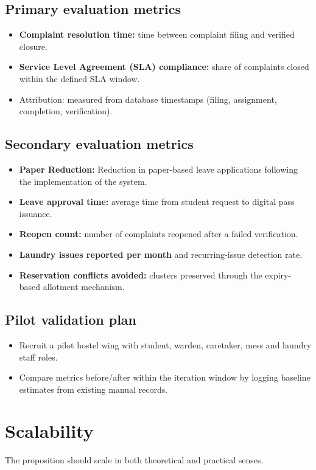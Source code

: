 \documentclass[11pt,a4paper]{article}
\begin{document}
\subsection{Primary evaluation metrics}
\begin{itemize}[leftmargin=0.7cm]
    \item \textbf{Complaint resolution time:} time between complaint filing and verified
    closure.
    \item \textbf{Service Level Agreement (SLA) compliance:} share of complaints closed within the defined SLA window.
    \item Attribution: measured from database timestamps (filing, assignment, completion,
    verification).
\end{itemize}

\subsection{Secondary evaluation metrics}
\begin{itemize}[leftmargin=0.7cm]
    \item \textbf{Paper Reduction:} Reduction in paper-based leave applications following the implementation of the system.
    \item \textbf{Leave approval time:} average time from student request to digital pass
    issuance.
    \item \textbf{Reopen count:} number of complaints reopened after a failed verification.
    \item \textbf{Laundry issues reported per month} and recurring-issue detection rate.
    \item \textbf{Reservation conflicts avoided:} clusters preserved through the expiry-based
    allotment mechanism.
\end{itemize}

\subsection{Pilot validation plan }
\begin{itemize}[leftmargin=0.7cm]
    \item Recruit a pilot hostel wing with student, warden, caretaker, mess and laundry staff
    roles.
    \item Compare metrics before/after within the iteration window by logging baseline
    estimates from existing manual records.
\end{itemize}

\section{Scalability }
The proposition should scale in both theoretical and practical senses.
\end{document}
